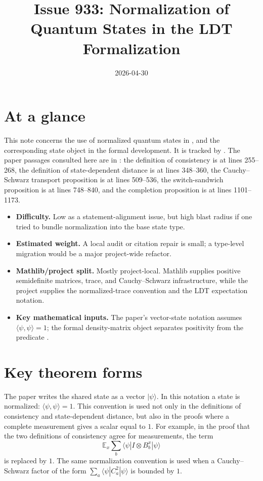 \documentclass[11pt]{article}
\title{Issue 933: Normalization of Quantum States in the LDT Formalization}
\author{}
\date{2026-04-30}
\begin{document}
\maketitle

\section{At a glance}

This note concerns the use of normalized quantum states in
\cite[Section~\emph{Preliminaries}]{Ji2020LowIndividualDegree}, and the
corresponding state object in the formal development.  It is tracked by
.  The paper passages consulted here are in
: the definition of consistency is
at lines 255--268, the definition of state-dependent distance is at lines
348--360, the Cauchy--Schwarz transport proposition is at lines 509--536, the
switch-sandwich proposition is at lines 748--840, and the completion proposition
is at lines 1101--1173.

\begin{itemize}
  \item \textbf{Difficulty.}  Low as a statement-alignment issue, but high
  blast radius if one tried to bundle normalization into the base state type.
  \item \textbf{Estimated weight.}  A local audit or citation repair is small;
  a type-level migration would be a major project-wide refactor.
  \item \textbf{Mathlib/project split.}  Mostly project-local.  Mathlib
  supplies positive semidefinite matrices, trace, and Cauchy--Schwarz
  infrastructure, while the project supplies the normalized-trace convention and
  the LDT expectation notation.
  \item \textbf{Key mathematical inputs.}  The paper's vector-state notation
  assumes $\langle\psi,\psi\rangle = 1$; the formal density-matrix object
  separates positivity from the predicate .
\end{itemize}

\section{Key theorem forms}

The paper writes the shared state as a vector $|\psi\rangle$. In this
notation a state is normalized: $\langle\psi,\psi\rangle=1$. This convention
is used not only in the definitions of consistency and state-dependent distance,
but also in the proofs where a complete measurement gives a scalar equal to
$1$. For example, in the proof that the two definitions of consistency agree
for measurements, the term
\[
  \mathbb E_x \sum_b \langle\psi| I\otimes B_b^x |\psi\rangle
\]
is replaced by $1$. The same normalization convention is used when a
Cauchy--Schwarz factor of the form
$\sum_a\langle\psi|C_a^2|\psi\rangle$ is bounded by $1$.
\end{document}
